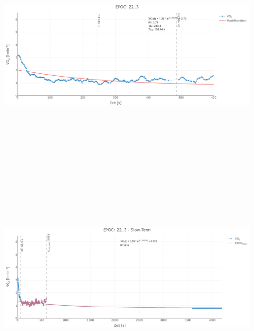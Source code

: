 \documentclass[
  letterpaper,
  DIV=11]{scrartcl}
\begin{document}
\includegraphics[width=11.45833in,height=4.6875in]{images/22_3_tau.png}
\includegraphics[width=11.45833in,height=4.6875in]{images/22_3_slow.png}
\end{document}

